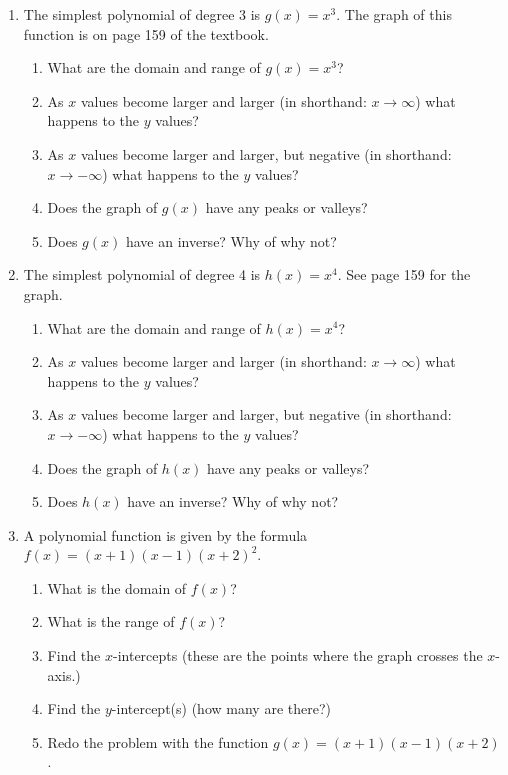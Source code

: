 \documentclass[11pt,dvipsnames]{article}
\begin{document}
\begin{enumerate}[label= {\bf  \arabic*:}]
\item The simplest polynomial of degree 3 is $\displaystyle g(x)=x^3$. The graph of this function is on page 159 of the textbook.
\begin{enumerate}[label=$\hdots$ {\bf  \alph*:}]
\item What are the domain and range of $\displaystyle g(x)=x^3$?
\item As $x$ values become larger and larger (in shorthand: $\displaystyle x\to \infty$) what happens to the $y$ values? 
\item As $x$ values become larger and larger, but negative (in shorthand: $\displaystyle x\to -\infty$) what happens to the $y$ values?
\item Does the graph of $g(x)$ have any peaks or valleys? 
\item Does $g(x)$ have an inverse? Why of why not?
\end{enumerate}
\item The simplest polynomial of degree 4 is $\displaystyle h(x)=x^4$. See page 159 for the graph.
\begin{enumerate}[label=$\hdots$ {\bf  \alph*:}]
	\item What are the domain and range of $\displaystyle h(x)=x^4$?
	\item As $x$ values become larger and larger (in shorthand: $\displaystyle x\to \infty$) what happens to the $y$ values? 
	\item As $x$ values become larger and larger, but negative (in shorthand: $\displaystyle x\to -\infty$) what happens to the $y$ values?
	\item Does the graph of $h(x)$ have any peaks or valleys? 
	\item Does $h(x)$ have an inverse? Why of why not?
\end{enumerate}
\item A polynomial function is given by the formula $\displaystyle f(x)=(x+1)(x-1)(x+2)^2$.
\begin{enumerate}[label=$\hdots$ {\bf  \alph*:}]
	\item What is the domain of $\displaystyle f(x)$?
	\item What is the range of $\displaystyle f(x)$?
	\item Find the $x$-intercepts (these are the points where the graph crosses the $x$-axis.)
	\item Find the $y$-intercept(s) (how many are there?)
	\item Redo the problem with the function $\displaystyle g(x)=(x+1)(x-1)(x+2)$.
\end{enumerate}
\end{enumerate}
\end{document}
